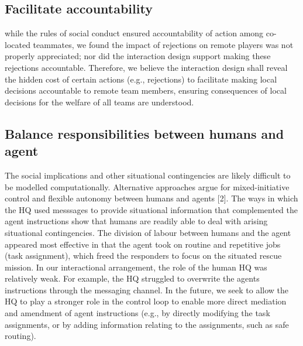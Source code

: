\subsection{Facilitate accountability}
while the rules of social conduct ensured accountability of action among co-located teammates, we found the impact of rejections on remote players was not properly appreciated; nor did the interaction design support making these rejections accountable. Therefore, we believe the interaction design shall reveal the hidden cost of certain actions (e.g., rejections) to facilitate making local decisions accountable to remote team members, ensuring consequences of local decisions for the welfare of all teams are understood. 

\subsection{Balance responsibilities between humans and agent}
 The social implications and other situational contingencies are likely difficult to be modelled computationally. Alternative approaches argue for mixed-initiative  control and flexible autonomy between humans and agents [2]. The ways in which the HQ used messsages to provide situational information that complemented the agent instructions show that humans are readily able to deal with arising situational contingencies. The division of labour between humans and the agent appeared most effective in that the agent took on routine and repetitive jobs (task assignment), which freed the responders to focus on the situated rescue mission. In our interactional arrangement, the role of the human HQ was relatively weak. For example, the HQ struggled to overwrite the agents instructions through the messaging channel. In the future, we seek to allow the HQ to play a stronger role in the control loop to enable more direct mediation and amendment of agent instructions (e.g., by directly modifying the task assignments, or by adding information relating to the assignments, such as safe routing).
 

